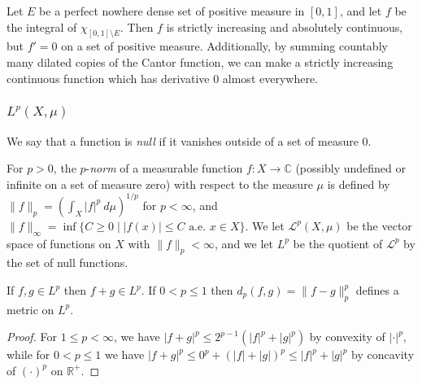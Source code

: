 \documentclass[letterpaper,11pt]{report}
\begin{document}
\begin{ex} Let $E$ be a perfect nowhere dense set of positive measure in $[0,1]$, and let $f$ be the integral of $\chi_{[0,1]\setminus E}$. Then $f$ is strictly increasing and absolutely continuous, but $f' = 0$ on a set of positive measure. Additionally, by summing countably many dilated copies of the Cantor function, we can make a strictly increasing continuous function which has derivative $0$ almost everywhere.
\end{ex}






\subsubsection{$L^p(X,\mu)$}


\begin{defn} We say that a function is \emph{null} if it vanishes outside of a set of measure $0$.
\end{defn}

\begin{defn} For $p > 0$, the $p$-\emph{norm} of a measurable function $f : X \rightarrow \mathbb{C}$ (possibly undefined or infinite on a set of measure zero) with respect to the measure $\mu$ is defined by $\|f\|_p = (\int_X |f|^p\ d\mu)^{1/p}$ for $p < \infty$, and $\|f\|_\infty = \inf\{C \ge 0 \mid |f(x)| \le C\text{ a.e. }x \in X\}$. We let $\mathcal{L}^p(X,\mu)$ be the vector space of functions on $X$ with $\|f\|_p < \infty$, and we let $L^p$ be the quotient of $\mathcal{L}^p$ by the set of null functions.
\end{defn}

\begin{prop} If $f, g \in L^p$ then $f+g \in L^p$. If $0 < p \le 1$ then $d_p(f,g) = \|f-g\|_p^p$ defines a metric on $L^p$.
\end{prop}
\begin{proof} For $1 \le p < \infty$, we have $|f+g|^p \le 2^{p-1}(|f|^p + |g|^p)$ by convexity of $|\cdot |^p$, while for $0 < p \le 1$ we have $|f+g|^p \le 0^p + (|f|+|g|)^p \le |f|^p + |g|^p$ by concavity of $(\cdot )^p$ on $\mathbb{R}^+$.
\end{proof}
\end{document}
